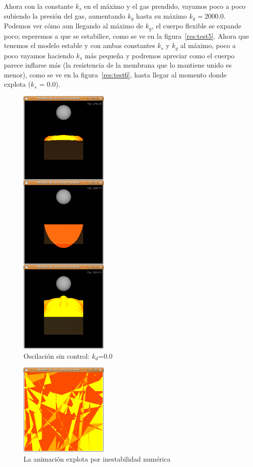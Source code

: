 Ahora con la constante $k_s$ en el máximo y el gas prendido, vayamos poco a poco subiendo la presión del gas, aumentando $k_g$ hasta su máximo $k_g=$2000.0. 
Podemos ver cómo aun llegando al máximo de $k_g$, el cuerpo flexible se expande poco; esperemos a que se estabilice, como se ve en la figura~\ref{res:test5}. 
Ahora que tenemos el modelo estable y con ambas constantes $k_s$ y $k_g$ al máximo, poco a poco vayamos haciendo $k_s$ más pequeña y podremos apreciar como el cuerpo parece inflarse más (la resistencia de la membrana que lo mantiene unido es menor), como se ve en la figura~\ref{res:test6}, hasta llegar al momento donde explota ($k_s$ = 0.0).

\begin{figure}
 \centering
 \includegraphics[]{Img/modRes1}
 \caption[Ejecución sin fuerza de amortiguamiento]{Oscilación sin control: $k_d$=0.0}
 \label{res:test1}
\end{figure}

\begin{figure}
 \centering
 \includegraphics[]{Img/modRes4}
 \caption[Explosión por inestabilidad numérica]{La animación explota por inestabilidad numérica}
 \label{res:test4}
\end{figure}

